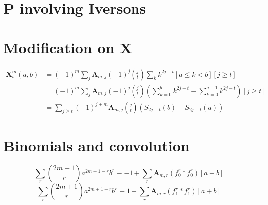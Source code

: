 \documentclass[12pt, letterpaper]{amsart}
\theoremstyle{definition}
\theoremstyle{remark}
\numberwithin{equation}{section}
\begin{document}
\section{P involving Iversons}
\section{Modification on X}
\begin{equation*}
\begin{split}
\mathbf{X}^{m}_{t}(a,b)
&= (-1)^m \sum\limits_{j} \mathbf{A}_{m,j} (-1)^j \binom{j}{t} \sum\limits_{k}k^{2j-t}[a\leq k<b][j\geq t] \\
&= (-1)^m \sum\limits_{j} \mathbf{A}_{m,j} (-1)^j \binom{j}{t}\left( \sum\limits_{k=0}^{b}k^{2j-t}-\sum\limits_{k=0}^{a-1}k^{2j-t}\right)[j\geq t] \\
&=\sum\limits_{j\geq t}(-1)^{j+m} \mathbf{A}_{m,j} \binom{j}{t}(S_{2j-t}(b)-S_{2j-t}(a))
\end{split}
\end{equation*}
\section{Binomials and convolution}
\begin{equation*}
\sum_{r} \binom{2m+1}{r} a^{2m+1-r} b^r \equiv -1 + \sum\limits_{r}\mathbf{A}_{m,r} (f_{0}^{r} \ast f_{0}^{r})[a+b]
\end{equation*}
\begin{equation*}
\sum_{r} \binom{2m+1}{r} a^{2m+1-r} b^r \equiv 1 + \sum\limits_{r}\mathbf{A}_{m,r} (f_{1}^{r} \ast f_{1}^{r})[a+b]
\end{equation*}
\end{document}

